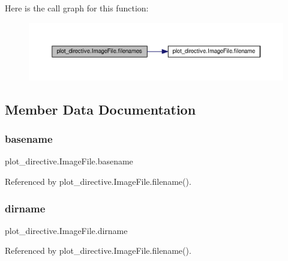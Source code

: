 Here is the call graph for this function\+:
\nopagebreak
\begin{figure}[H]
\begin{center}
\leavevmode
\includegraphics[width=350pt]{classplot__directive_1_1ImageFile_a1497c4d40e8500e207de9e483d639f39_cgraph}
\end{center}
\end{figure}


\subsection{Member Data Documentation}
\mbox{\label{classplot__directive_1_1ImageFile_afa0e2d74c60b443628f731c96c7b1cb0}} 
\subsubsection{\texorpdfstring{basename}{basename}}
{\footnotesize\ttfamily plot\+\_\+directive.\+Image\+File.\+basename}



Referenced by plot\+\_\+directive.\+Image\+File.\+filename().

\mbox{\label{classplot__directive_1_1ImageFile_ab3f5e486f644bc939202814ecd5aec0c}} 
\subsubsection{\texorpdfstring{dirname}{dirname}}
{\footnotesize\ttfamily plot\+\_\+directive.\+Image\+File.\+dirname}



Referenced by plot\+\_\+directive.\+Image\+File.\+filename().

